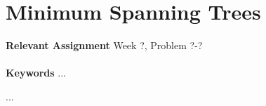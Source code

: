 
\chapter{Minimum Spanning Trees}
\label{ch:minimumspanningtrees}

\textbf{Relevant Assignment} Week ?, Problem ?-?\\\\
\textbf{Keywords} ...
\vspace{1in}

\noindent ...

